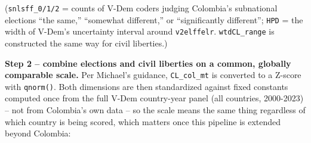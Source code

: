\documentclass[
]{article}
\begin{document}
(\texttt{snlsff\_0/1/2} = counts of V-Dem coders judging Colombia's
subnational elections ``the same,'' ``somewhat different,'' or
``significantly different''; \texttt{HPD} = the width of V-Dem's
uncertainty interval around \texttt{v2elffelr}. \texttt{wtdCL\_range} is
constructed the same way for civil liberties.)

\textbf{Step 2 -- combine elections and civil liberties on a common,
globally comparable scale.} Per Michael's guidance, \texttt{CL\_col\_mt}
is converted to a Z-score with \texttt{qnorm()}. Both dimensions are
then standardized against fixed constants computed once from the full
V-Dem country-year panel (all countries, 2000-2023) -- not from
Colombia's own data -- so the scale means the same thing regardless of
which country is being scored, which matters once this pipeline is
extended beyond Colombia:
\end{document}
